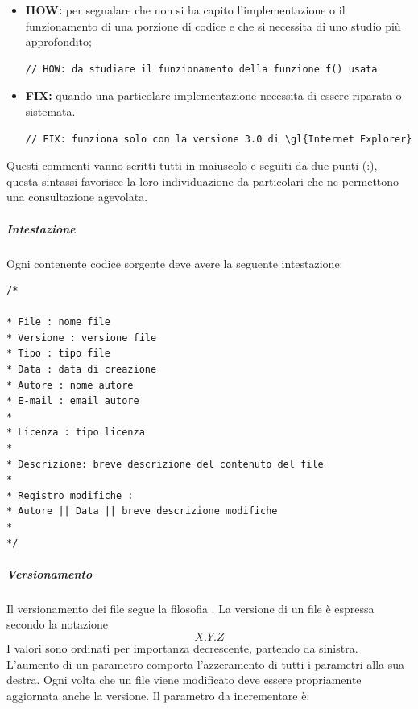\begin{itemize}
\begin{itemize}
				\item \textbf{HOW:} per segnalare che non si ha capito l'implementazione o il funzionamento di una porzione di codice e che si necessita di uno studio più approfondito;
				\begin{lstlisting}
// HOW: da studiare il funzionamento della funzione f() usata
				\end{lstlisting}
				
				\item \textbf{FIX:} quando una particolare implementazione necessita di essere riparata o sistemata.
				\begin{lstlisting}
// FIX: funziona solo con la versione 3.0 di \gl{Internet Explorer}
				\end{lstlisting}
			\end{itemize}
			Questi commenti vanno scritti tutti in maiuscolo e seguiti da due punti (:), questa sintassi favorisce la loro individuazione da particolari  che ne permettono una consultazione agevolata.
			
			\end{itemize}
			\subparagraph{Intestazione} \Spazio
			Ogni  contenente codice sorgente deve avere la seguente intestazione:
			\begin{lstlisting}
/*

* File : nome file
* Versione : versione file
* Tipo : tipo file
* Data : data di creazione
* Autore : nome autore 
* E-mail : email autore 
*
* Licenza : tipo licenza				
*
* Descrizione: breve descrizione del contenuto del file
*
* Registro modifiche :
* Autore || Data || breve descrizione modifiche
*
*/
			\end{lstlisting}
			\subparagraph{Versionamento} \Spazio
			Il versionamento dei file segue la filosofia . La versione di un file è espressa secondo la notazione $$X.Y.Z$$ I valori sono ordinati per importanza decrescente, partendo da sinistra. L'aumento di un parametro comporta l'azzeramento di tutti i parametri alla sua destra. Ogni volta che un file viene modificato deve essere propriamente aggiornata anche la versione. Il parametro da incrementare è:

